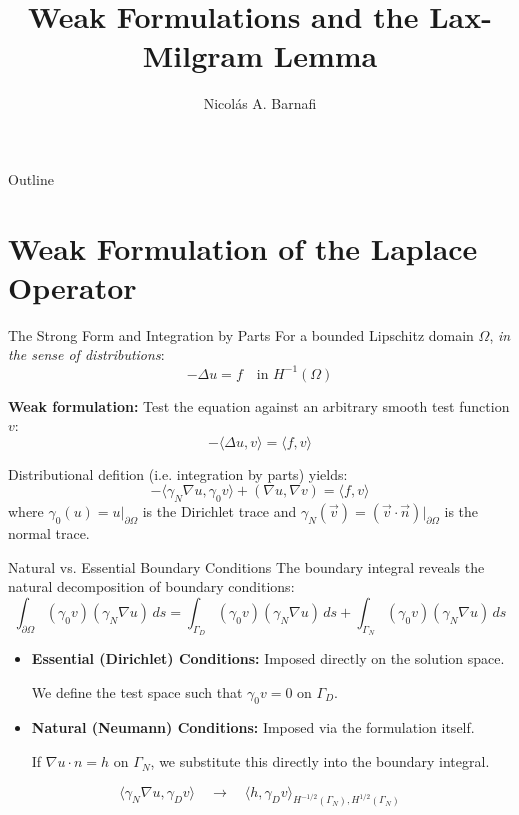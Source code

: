 \documentclass[aspectratio=169]{beamer}
\title[Weak Formulations \& Lax-Milgram]{Weak Formulations and the Lax-Milgram Lemma}
\author{Nicol\'as A. Barnafi}
\date{}
\begin{document}
\begin{frame}
    \titlepage
\end{frame}

\begin{frame}{Outline}
    \tableofcontents
\end{frame}


\section{Weak Formulation of the Laplace Operator}

\begin{frame}{The Strong Form and Integration by Parts}
    For a bounded Lipschitz domain $\Omega$, \emph{in the sense of distributions}:
    $$ -\Delta u = f \quad \text{in } H^{-1}(\Omega) $$

    \vspace{0.2cm}
    \textbf{Weak formulation:} Test the equation against an arbitrary smooth test function $v$:
    $$ -\langle\Delta u, v \rangle = \langle f, v\rangle  $$

    \vspace{0.2cm}
    Distributional defition (i.e. integration by parts) yields:
    $$ -\langle \gamma_N \nabla u,\gamma_0 v\rangle + (\nabla u, \nabla v) = \langle f, v \rangle $$
    where $\gamma_0(u) = u|_{\partial\Omega}$ is the Dirichlet trace and $\gamma_N(\vec v)=(\vec v\cdot \vec n)|_{\partial\Omega}$ is the normal trace.
\end{frame}

\begin{frame}{Natural vs. Essential Boundary Conditions}
    The boundary integral reveals the natural decomposition of boundary conditions:
    $$ \int_{\partial\Omega} (\gamma_0 v) (\gamma_N \nabla u) \, ds = \int_{\Gamma_D} (\gamma_0 v) (\gamma_N \nabla u) \, ds + \int_{\Gamma_N} (\gamma_0 v) (\gamma_N \nabla u) \, ds $$

    \begin{itemize}
        \item \textbf{Essential (Dirichlet) Conditions:} Imposed directly on the solution space. 

            We define the test space such that $\gamma_0 v = 0$ on $\Gamma_D$. 
        \item \textbf{Natural (Neumann) Conditions:} Imposed via the formulation itself.

            If $\nabla u \cdot n = h$ on $\Gamma_N$, we substitute this directly into the boundary integral.
    \end{itemize}

$$ \langle \gamma_N \nabla u, \gamma_D v \rangle \quad\to\quad \langle h, \gamma_D v \rangle_{H^{-1/2}(\Gamma_N),H^{1/2}(\Gamma_N)} $$
\end{frame}
\end{document}
